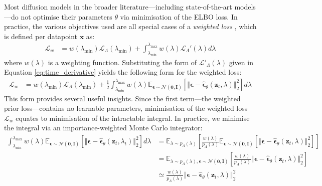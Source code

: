 \documentclass[ oneside,%
                    author={George Herbert},
                    degree={MSci},
                     title={Video Diffusion Models for Climate Simulations},
                  subtitle={}]{dissertation}
\begin{document}
Most diffusion models in the broader literature---including state-of-the-art models---do not optimise their parameters $\theta$ via minimisation of the ELBO loss. In practice, the various objectives used are all special cases of a \textit{weighted loss} \cite{Understanding_Diffusion_Objective_Kingma}, which is defined per datapoint $\mathbf{x}$ as:
\begin{align}
      \mathcal{L}_w&=w(\lambda_{\min})\mathcal{L}_\Lambda(\lambda_{\min})+\int_{\lambda_{\min}}^{\lambda_{\max}}w(\lambda)\mathcal{L}_\Lambda'(\lambda)d\lambda
\end{align}
where $w(\lambda)$ is a weighting function. Substituting the form of $\mathcal{L}'_\Lambda(\lambda)$ given in Equation \ref{eq:time_derivative} yields the following form for the weighted loss:
\begin{align}
      \mathcal{L}_w&=w(\lambda_{\min})\mathcal{L}_\Lambda(\lambda_{\min})+\frac{1}{2}\int_{\lambda_{\min}}^{\lambda_{\max}}w(\lambda)\mathbb{E}_{\boldsymbol\epsilon\sim\mathcal{N}(\mathbf{0},\mathbf{I})}\left[\Vert\boldsymbol\epsilon-\hat{\boldsymbol\epsilon}_\theta(\mathbf{z}_t,\lambda)\Vert_2^2\right]d\lambda
\end{align}
This form provides several useful insights. Since the first term---the weighted prior loss---contains no learnable parameters, minimisation of the weighted loss $\mathcal{L}_w$ equates to minimisation of the intractable integral. In practice, we minimise the integral via an importance-weighted Monte Carlo integrator:
\begin{align}
      \int_{\lambda_{\min}}^{\lambda_{\max}}w(\lambda)\mathbb{E}_{\boldsymbol\epsilon\sim\mathcal{N}(\mathbf{0},\mathbf{I})}\left[\Vert\boldsymbol\epsilon-\hat{\boldsymbol\epsilon}_\theta(\mathbf{z}_t,\lambda_t)\Vert_2^2\right]d\lambda&=\mathbb{E}_{\lambda\sim p_\Lambda(\lambda)}\left[\frac{w(\lambda)}{p_\Lambda(\lambda)}\mathbb{E}_{\boldsymbol\epsilon\sim\mathcal{N}(\mathbf{0},\mathbf{I})}\left[\Vert\boldsymbol\epsilon - \hat{\boldsymbol\epsilon}_\theta(\mathbf{z}_t, \lambda)\Vert_2^2 \right]\right]\\
      &=\mathbb{E}_{\lambda\sim p_\Lambda(\lambda),\boldsymbol\epsilon\sim\mathcal{N}(\mathbf{0}, \mathbf{I})}\left[\frac{w(\lambda)}{p_\Lambda(\lambda)}\Vert \boldsymbol\epsilon-\hat{\boldsymbol\epsilon}_\theta(\mathbf{z}_t,\lambda)\Vert_2^2\right]\\
      &\simeq \frac{w(\lambda)}{p_\Lambda(\lambda)}\Vert \boldsymbol\epsilon-\hat{\boldsymbol\epsilon}_\theta(\mathbf{z}_t,\lambda)\Vert_2^2
\end{align}
\end{document}
